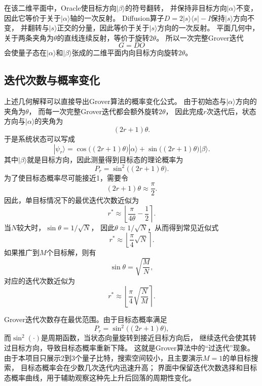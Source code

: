在该二维平面中，Oracle使目标方向\(|\beta\rangle\)的符号翻转，
并保持非目标方向\(|\alpha\rangle\)不变，因此它等价于关于\(|\alpha\rangle\)轴的一次反射。
Diffusion算子\(D=2|s\rangle\langle s|-I\)保持\(|s\rangle\)方向不变，
并翻转与\(|s\rangle\)正交的分量，因此等价于关于\(|s\rangle\)方向的一次反射。
平面几何中，关于两条夹角为\(\theta\)的直线连续反射，等价于旋转\(2\theta\)。
所以一次完整Grover迭代
\[
    G=DO
\]
会使量子态在\(|\alpha\rangle\)和\(|\beta\rangle\)张成的二维平面内向目标方向旋转\(2\theta\)。

\subsection{迭代次数与概率变化}

上述几何解释可以直接导出Grover算法的概率变化公式。
由于初始态与\(|\alpha\rangle\)方向的夹角为\(\theta\)，
而每一次完整Grover迭代都会额外旋转\(2\theta\)，
因此完成\(r\)次迭代后，状态方向与\(|\alpha\rangle\)的夹角为
\[
    (2r+1)\theta.
\]
于是系统状态可以写成
\[
    |\psi_r\rangle
    =\cos\big((2r+1)\theta\big)|\alpha\rangle
    +\sin\big((2r+1)\theta\big)|\beta\rangle.
\]
其中\(|\beta\rangle\)就是目标方向，因此测量得到目标态的理论概率为
\[
    P_r=\sin^2\big((2r+1)\theta\big).
\]
为了使目标态概率尽可能接近1，需要令
\[
    (2r+1)\theta \approx \frac{\pi}{2}.
\]
因此，单目标情况下的最优迭代次数近似为
\[
    r^\ast
    \approx
    \left\lfloor \frac{\pi}{4\theta}-\frac{1}{2}\right\rceil.
\]
当\(N\)较大时，\(\sin\theta=1/\sqrt{N}\)，
因此\(\theta\approx 1/\sqrt{N}\)，从而得到常见近似式
\[
    r^\ast \approx \left\lfloor \frac{\pi}{4}\sqrt{N}\right\rceil.
\]
如果推广到\(M\)个目标解，则有
\[
    \sin\theta=\sqrt{\frac{M}{N}},
\]
对应的迭代次数近似为
\[
    r^\ast \approx \left\lfloor \frac{\pi}{4}\sqrt{\frac{N}{M}}\right\rceil.
\]

Grover迭代次数存在最优范围。由于目标态概率满足
\[
    P_r=\sin^2\big((2r+1)\theta\big),
\]
而\(\sin^2(\cdot)\)是周期函数，当状态向量旋转到接近目标方向后，
继续迭代会使其转过目标方向，导致目标态概率重新下降。
这就是Grover算法中的“过迭代”现象。
由于本项目只展示2到3个量子比特，搜索空间较小，且主要演示\(M=1\)的单目标搜索，
目标态概率会在少数几次迭代内迅速升高；
界面中保留迭代次数选择和目标态概率曲线，用于辅助观察这种先上升后回落的周期性变化。
